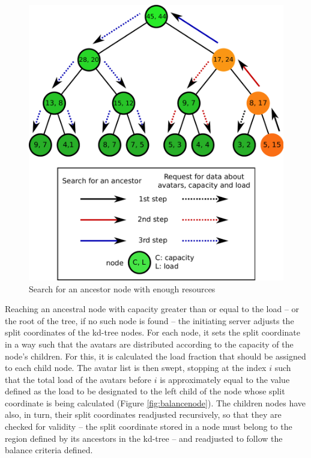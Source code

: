 \documentclass[acmjacm]{acmtrans2m}
\newcommand{\figurecaption}{Figure}
\begin{document}
\begin{figure}
  \centering
  \includegraphics[width=0.8\linewidth]{images/ancestors}
  \caption{Search for an ancestor node with enough resources}
   \label{fig:ancestors}
\end{figure}

Reaching an ancestral node with capacity greater than or equal to the load -- or the root of the tree, if no such node is found -- the initiating server adjusts the split coordinates of the kd-tree nodes. For each node, it sets the split coordinate in a way such that the avatars are distributed according to the capacity of the node's children. For this, it is calculated the load fraction that should be assigned to each child node. The avatar list is then swept, stopping at the index $i$ such that the total load of the avatars before $i$ is approximately equal to the value defined as the load to be designated to the left child of the node whose split coordinate is being calculated (\figurecaption{} \ref{fig:balancenode}). The children nodes have also, in turn, their split coordinates readjusted recursively, so that they are checked for validity -- the split coordinate stored in a node must belong to the region defined by its ancestors in the kd-tree -- and readjusted to follow the balance criteria defined.
\end{document}
